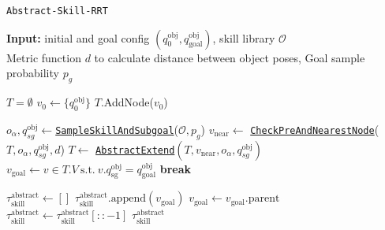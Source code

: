 \begin{algorithm}[H]
\caption{\texttt{Abstract-Skill-RRT}}\label{algo:Abstract-skill-rrt}
\begin{algorithmic}[1]
\State \textbf{Input:} initial and goal config $(q^{\text{obj}}_0, q^{\text{obj}}_{\text{goal}})$, skill library $\mathcal{O}$ \\
Metric function $d$ to calculate distance between object poses, Goal sample probability $p_g$

\State $T=\emptyset$    
\State $v_{0} \gets \{ q^{\text{obj}}_{0}\}$ 
\State $T$.AddNode($v_{0}$)

    \State ${o_\alpha}, {q}^{\text{obj}}_{sg} \gets $\hyperref[algo:SampleSkillAndPose]{\texttt{SampleSkillAndSubgoal}}($\mathcal{O}, p_g$)
    \State ${v}_{\text{near}} \gets$ \hyperref[algo:NearestNode]{\texttt{CheckPreAndNearestNode}}($T, o_\alpha, q^{\text{obj}}_{sg}, d$)
    \State $T \leftarrow $ \hyperref[algo:AbstractExtend]{\texttt{AbstractExtend}}$(T, v_{\text{near}}, o_\alpha, {q}^{\text{obj}}_{sg})$
        \State $v_{\text{goal}} \gets v \in T.V \ \text{s.t.} \ v.q^{\text{obj}}_{\text{sg}} = q^{\text{obj}}_{\text{goal}}$
        \State \textbf{break}
    \EndIf
\EndWhile

\State $\tau^\text{abstract}_{\text{skill}} \gets []$ 
    \State $\tau^\text{abstract}_{\text{skill}}.\text{append}(v_{\text{goal}})$
    \State $v_{\text{goal}} \gets v_{\text{goal}}.\text{parent}$
\EndWhile
\State $\tau^\text{abstract}_{\text{skill}} \gets \tau^\text{abstract}_{\text{skill}}[::-1]$ 
\State \Return $\tau^\text{abstract}_{\text{skill}}$

\end{algorithmic}
\end{algorithm}
